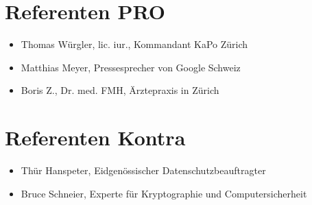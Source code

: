 \documentclass{scrartcl}
\begin{document}
\section*{Referenten PRO}

\begin{itemize}
\item Thomas Würgler, lic. iur., Kommandant KaPo Zürich
\item Matthias Meyer, Pressesprecher von Google Schweiz
\item Boris Z., Dr. med. FMH, Ärztepraxis in Zürich
\end{itemize}


\section*{Referenten Kontra}

\begin{itemize}
\item Thür Hanspeter, Eidgenössischer Datenschutzbeauftragter
\item Bruce Schneier, Experte für Kryptographie und Computersicherheit
\end{itemize}
\end{document}
